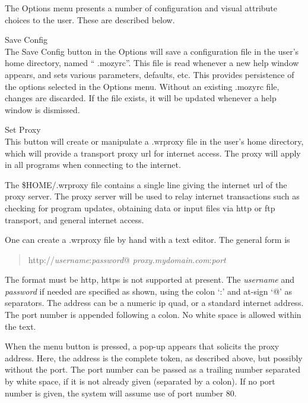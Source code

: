 The {\cb Options} menu presents a number of configuration and visual
attribute choices to the user.  These are described below.
\begin{description}

\item{\cb Save Config}\\
The {\cb Save Config} button in the {\cb Options} will save a
configuration file in the user's home directory, named ``{\vt
.mozyrc}''.  This file is read whenever a new help window appears, and
sets various parameters, defaults, etc.  This provides persistence of
the options selected in the {\cb Options} menu.  Without an existing 
{\vt .mozyrc} file, changes are discarded.  If the file exists, it
will be updated whenever a help window is dismissed.

\item{\cb Set Proxy}\\
This button will create or manipulate a {\vt .wrproxy} file in the
user's home directory, which will provide a transport proxy url for
internet access.  The proxy will apply in all {\XicTools} programs
when connecting to the internet.

The {\vt \$HOME/.wrproxy} file contains a single line giving the
internet url of the proxy server.  The proxy server will be used to
relay internet transactions such as checking for program updates,
obtaining data or input files via http or ftp transport, and general
internet access.

One can create a {\vt .wrproxy} file by hand with a text editor.  The
general form is
\begin{quote}
{\vt http://}{\it username\/}{\vt :}{\it password\/}{\vt @}{\it
 proxy.mydomain.com\/}{\vt :}{\it port}
\end{quote}
The format must be {\vt http}, {\vt https} is not supported at
present.  The {\it username} and {\it password} if needed are
specified as shown, using the colon `{\vt :}' and at-sign `{\vt @}' as
separators.  The address can be a numeric ip quad, or a standard
internet address.  The port number is appended following a colon.  No
white space is allowed within the text.

When the menu button is pressed, a pop-up appears that solicits the
proxy address.  Here, the address is the complete token, as described
above, but possibly without the port.  The port number can be passed
as a trailing number separated by white space, if it is not already
given (separated by a colon).  If no port number is given, the system
will assume use of port number 80.


\end{description}
